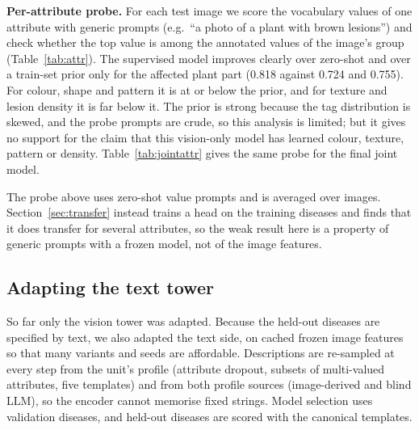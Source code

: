 \documentclass[11pt]{article}
\begin{document}
\textbf{Per-attribute probe.} For each test image we score the vocabulary values of one attribute with generic prompts (e.g.\ ``a photo of a plant with brown lesions'') and check whether the top value is among the annotated values of the image's group (Table~\ref{tab:attr}). The supervised model improves clearly over zero-shot and over a train-set prior only for the affected plant part (0.818 against 0.724 and 0.755). For colour, shape and pattern it is at or below the prior, and for texture and lesion density it is far below it. The prior is strong because the tag distribution is skewed, and the probe prompts are crude, so this analysis is limited; but it gives no support for the claim that this vision-only model has learned colour, texture, pattern or density. Table~\ref{tab:jointattr} gives the same probe for the final joint model.
\begin{table}[t]\centering\small
\resizebox{\linewidth}{!}{}
\caption{Per-attribute probe on test images (mean over the 10 folds, seed 0). Fraction of images whose top-scoring value is among their group's annotated values, averaged over test \emph{images} (not diseases); prior = most frequent individual training value; chance = expected hit of a random value. The numbers are therefore not comparable with the disease-macro Tables~\ref{tab:transfer} and~\ref{tab:jointattr}.}\label{tab:attr}
\end{table}

The probe above uses zero-shot value prompts and is averaged over images. Section~\ref{sec:transfer} instead trains a head on the training diseases and finds that it does transfer for several attributes, so the weak result here is a property of generic prompts with a frozen model, not of the image features.

\subsection{Adapting the text tower}\label{sec:textside}
So far only the vision tower was adapted. Because the held-out diseases are specified by text, we also adapted the text side, on cached frozen image features so that many variants and seeds are affordable. Descriptions are re-sampled at every step from the unit's profile (attribute dropout, subsets of multi-valued attributes, five templates) and from both profile sources (image-derived and blind LLM), so the encoder cannot memorise fixed strings. Model selection uses validation diseases, and held-out diseases are scored with the canonical templates.
\end{document}
